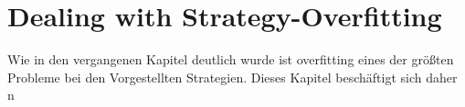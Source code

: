 \section{Dealing with Strategy-Overfitting}
\label{chap:overfitting}

Wie in den vergangenen Kapitel deutlich wurde ist overfitting eines der größten Probleme bei den Vorgestellten Strategien.
Dieses Kapitel beschäftigt sich daher n

